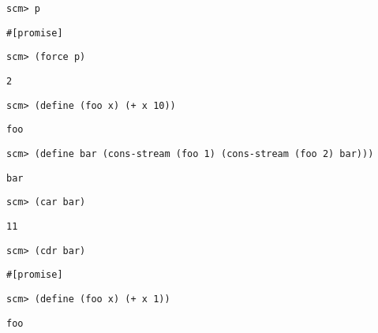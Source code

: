 \documentclass{exam}
\begin{document}
\begin{questions}
\begin{blocksection}
\begin{lstlisting}
scm> p
\end{lstlisting}
\begin{solution}[.45in]
\begin{lstlisting}
#[promise]
\end{lstlisting}
\end{solution}

\begin{lstlisting}
scm> (force p)
\end{lstlisting}
\begin{solution}[.45in]
\begin{lstlisting}
2
\end{lstlisting}
\end{solution}

\begin{lstlisting}
scm> (define (foo x) (+ x 10))
\end{lstlisting}
\begin{solution}[.45in]
\texttt{foo}
\end{solution}

\begin{lstlisting}
scm> (define bar (cons-stream (foo 1) (cons-stream (foo 2) bar)))
\end{lstlisting}
\begin{solution}[.45in]
\texttt{bar}
\end{solution}
\end{blocksection}

\begin{blocksection}
\begin{lstlisting}
scm> (car bar)
\end{lstlisting}
\begin{solution}[.45in]
\texttt{11}
\end{solution}

\begin{lstlisting}
scm> (cdr bar)
\end{lstlisting}
\begin{solution}[.45in]
\begin{lstlisting}
#[promise]
\end{lstlisting}
\end{solution}

\begin{lstlisting}
scm> (define (foo x) (+ x 1))
\end{lstlisting}
\begin{solution}[.35in]
\texttt{foo}
\end{solution}


\end{blocksection}
\end{questions}
\end{document}

